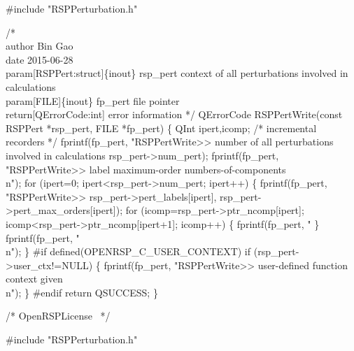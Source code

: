 #include "RSPPerturbation.h"

/*%
    \\author Bin Gao
    \\date 2015-06-28
    \\param[RSPPert:struct]\{inout\} rsp_pert context of all perturbations involved in calculations
    \\param[FILE]\{inout\} fp_pert file pointer
    \\return[QErrorCode:int] error information
*/
QErrorCode RSPPertWrite(const RSPPert *rsp_pert, FILE *fp_pert)
\{
    QInt ipert,icomp;  /* incremental recorders */
    fprintf(fp_pert,
            "RSPPertWrite>> number of all perturbations involved in calculations %
            rsp_pert->num_pert);
    fprintf(fp_pert,
            "RSPPertWrite>> label           maximum-order    numbers-of-components\\n");
    for (ipert=0; ipert<rsp_pert->num_pert; ipert++) \{
        fprintf(fp_pert,
                "RSPPertWrite>>  %
                rsp_pert->pert_labels[ipert],
                rsp_pert->pert_max_orders[ipert]);
        for (icomp=rsp_pert->ptr_ncomp[ipert]; icomp<rsp_pert->ptr_ncomp[ipert+1]; icomp++) \{
            fprintf(fp_pert, " %
        \}
        fprintf(fp_pert, "\\n");
    \}
#if defined(OPENRSP_C_USER_CONTEXT)
    if (rsp_pert->user_ctx!=NULL) \{
        fprintf(fp_pert, "RSPPertWrite>> user-defined function context given\\n");
    \}
#endif
    return QSUCCESS;
\}

\nwendcode{}\endmoddef
/*
  \LA{}OpenRSPLicense~{\nwtagstyle{}}\RA{}
*/

#include "RSPPerturbation.h"

